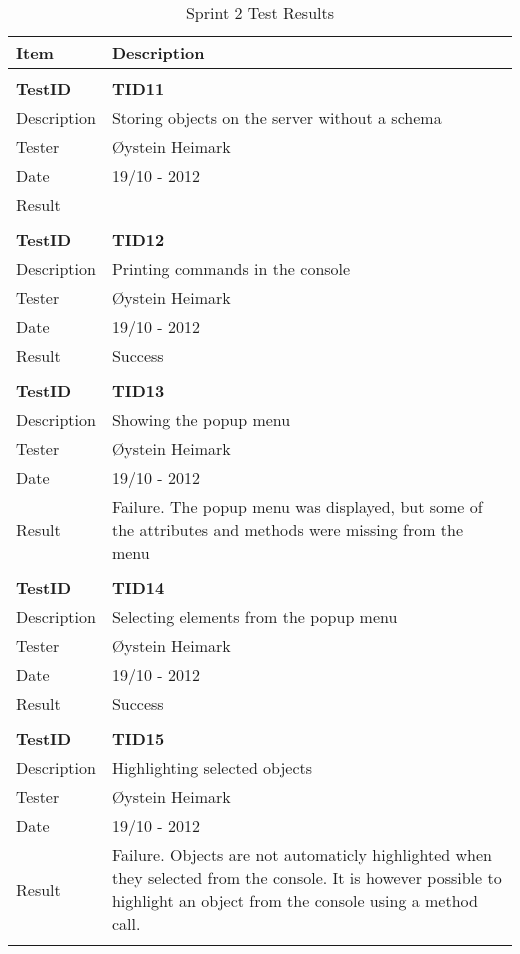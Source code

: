 \begin{table}
\caption{Sprint 2 Test Results}
\centering
\begin{tabular}{ l p{13cm} }

\hline 
Item			&Description		\\
\hline \\ [-2.0ex]

\bf{TestID}		&\bf{TID11}			\\
Description	&Storing objects on the server without a schema	\\
Tester		&Øystein Heimark	\\
Date			&19/10 - 2012	\\
Result		&				\\
\hline \\ [-2.0ex]

\bf{TestID}		&\bf{TID12}			\\
Description	&Printing commands in the console 	\\
Tester		&Øystein Heimark	\\
Date			&19/10 - 2012	\\
Result		&Success			\\
\hline \\ [-2.0ex]

\bf{TestID}		&\bf{TID13}			\\
Description	&Showing the popup menu	\\
Tester		&Øystein Heimark	\\
Date			&19/10 - 2012	\\
Result		&Failure. The popup menu was displayed, but some of the attributes and methods were missing from the menu				\\
\hline \\ [-2.0ex]

\bf{TestID}		&\bf{TID14}			\\
Description	&Selecting elements from the popup menu	\\
Tester		&Øystein Heimark	\\
Date			&19/10 - 2012	\\
Result		&Success			\\
\hline \\ [-2.0ex]

\bf{TestID}		&\bf{TID15}			\\
Description	&Highlighting selected objects	\\
Tester		&Øystein Heimark	\\
Date			&19/10 - 2012	\\
Result		&Failure. Objects are not automaticly highlighted when they selected from the console. It is however possible to highlight an object from the console using a method call.	\\
\hline \\ [-2.0ex]


\end{tabular}
\end{table}
